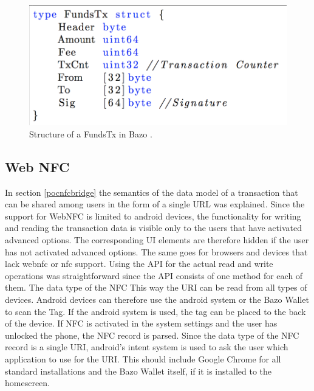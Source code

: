 \begin{figure}
\centering
\includegraphics[width=1\textwidth]{diagrams/AccountTx_struct.png}
\caption{\label{fig:FundsTX}Structure of a FundsTx in Bazo \cite{lisg}.}
\end{figure}

\subsection{Web NFC}
In section \ref{pocnfcbridge} the semantics of the data model of a transaction that can be shared among users in the form of a single URL was explained.
Since the support for WebNFC is limited to android devices, the functionality for writing and reading the transaction data is visible only to the users that have activated advanced options.
The corresponding UI elements are therefore hidden if the user has not activated advanced options. The same goes for browsers and devices that lack webnfc or nfc support.
Using the API for the actual read and write operations was straightforward since the API consists of one method for each of them. The data type of the NFC %
This way the URI can be read from all types of devices. Android devices can therefore use the android system or the Bazo Wallet to scan the Tag. If the android system is used, the tag can be placed to the back of the device. If NFC is activated in the system settings and the user has unlocked the phone, the NFC record is parsed. Since the data type of the NFC record is a single URI, android's intent system is used to ask the user which application to use for the URI. This should include Google Chrome for all standard installations and the Bazo Wallet itself, if it is installed to the homescreen.


